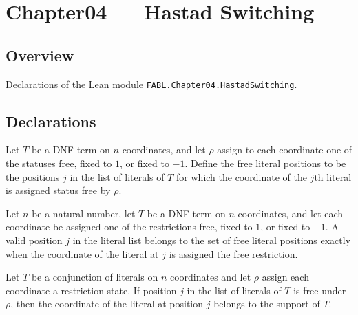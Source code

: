 \chapter{Chapter04 — Hastad Switching}
\section{Overview}

Declarations of the Lean module \texttt{FABL.Chapter04.HastadSwitching}.

\section{Declarations}

\begin{definition}
\label{FABL.DNFTerm.freeLiteralPositions}
\leanok
{}
Let $T$ be a DNF term on $n$ coordinates, and let $\rho$ assign to each coordinate one
of the statuses free, fixed to $1$, or fixed to $-1$. Define the free literal positions
to be the positions $j$ in the list of literals of $T$ for which the coordinate of the
$j$th literal is assigned status free by $\rho$.
\end{definition}

\begin{theorem}
\label{FABL.DNFTerm.mem_freeLiteralPositions_iff}
\leanok
{}
Let $n$ be a natural number, let $T$ be a DNF term on $n$ coordinates, and let each
coordinate be assigned one of the restrictions free, fixed to $1$, or fixed to $-1$. A
valid position $j$ in the literal list belongs to the set of free literal positions
exactly when the coordinate of the literal at $j$ is assigned the free restriction.
\end{theorem}

\begin{theorem}
\label{FABL.DNFTerm.freeLiteralPosition_coordinate_mem_support}
\leanok
{}
Let $T$ be a conjunction of literals on $n$ coordinates and let $\rho$ assign each
coordinate a restriction state. If position $j$ in the list of literals of $T$ is free
under $\rho$, then the coordinate of the literal at position $j$ belongs to the support
of $T$.
\end{theorem}

